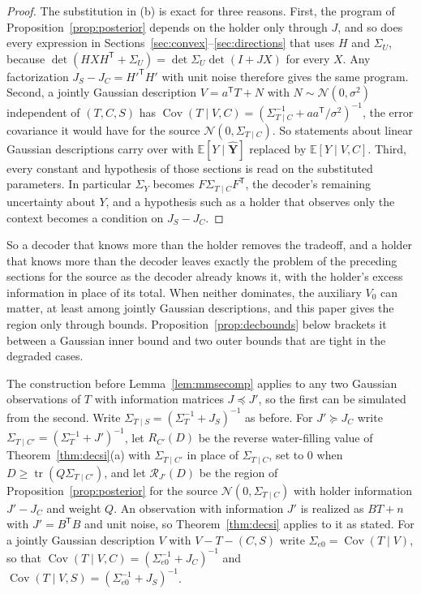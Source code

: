 \documentclass[11pt,onecolumn]{IEEEtran}
\newcommand{\E}{\mathbb{E}}
\newcommand{\tr}{\operatorname{tr}}
\newcommand{\Cov}{\operatorname{Cov}}
\newcommand{\hY}{\hat{\mathbf Y}}
\newcommand{\RW}{\mathcal{R}}
\newcommand{\Sez}{\Sigma_{e0}}
\begin{document}
\begin{proof}
The substitution in (b) is exact for three reasons. First, the program
of Proposition~\ref{prop:posterior} depends on the holder only through
$J$, and so does every expression in
Sections~\ref{sec:convex}--\ref{sec:directions} that uses $H$ and
$\Sigma_U$, because
$\det(HXH^{\mathsf T}+\Sigma_U)=\det\Sigma_U\det(I+JX)$ for every $X$.
Any factorization $J_S-J_C=H'^{\mathsf T}H'$ with unit noise therefore
gives the same program. Second, a jointly Gaussian description
$V=a^{\mathsf T}T+N$ with $N\sim\mathcal N(0,\sigma^2)$ independent of
$(T,C,S)$ has $\Cov(T\mid V,C)=(\Sigma_{T\mid C}^{-1}+aa^{\mathsf T}/\sigma^2)^{-1}$,
the error covariance it would have for the source
$\mathcal N(0,\Sigma_{T\mid C})$. So statements about linear Gaussian
descriptions carry over with $\E[Y\mid\hY]$ replaced by $\E[Y\mid V,C]$.
Third, every constant and hypothesis of those sections is read on the
substituted parameters. In particular $\Sigma_Y$ becomes
$F\Sigma_{T\mid C}F^{\mathsf T}$, the decoder's remaining uncertainty about
$Y$, and a hypothesis such as a holder that observes only the context
becomes a condition on $J_S-J_C$.
\end{proof}

So a decoder that knows more than the holder removes the tradeoff, and
a holder that knows more than the decoder leaves exactly the problem of
the preceding sections for the source as the decoder already knows it,
with the holder's excess information in place of its total. When
neither dominates, the auxiliary $V_0$ can matter, at least among
jointly Gaussian descriptions, and this paper gives
the region only through bounds. Proposition~\ref{prop:decbounds} below
brackets it between a Gaussian inner bound and two outer bounds that are
tight in the degraded cases.

The construction before Lemma~\ref{lem:mmsecomp} applies to any two
Gaussian observations of $T$ with information matrices $J\preceq J'$, so
the first can be simulated from the second. Write
$\Sigma_{T\mid S}=(\Sigma_T^{-1}+J_S)^{-1}$ as before. For $J'\succeq J_C$
write $\Sigma_{T\mid C'}=(\Sigma_T^{-1}+J')^{-1}$, let $R_{C'}(D)$ be the
reverse water-filling value of Theorem~\ref{thm:decsi}(a) with
$\Sigma_{T\mid C'}$ in place of $\Sigma_{T\mid C}$, set to $0$ when
$D\ge\tr(Q\Sigma_{T\mid C'})$, and let $\RW_{J'}(D)$ be the region of
Proposition~\ref{prop:posterior} for the source
$\mathcal N(0,\Sigma_{T\mid C})$ with holder information $J'-J_C$ and
weight $Q$. An observation with information $J'$ is realized as $BT+n$
with $J'=B^{\mathsf T}B$ and unit noise, so Theorem~\ref{thm:decsi}
applies to it as stated. For a jointly Gaussian description $V$ with
$V-T-(C,S)$ write $\Sez=\Cov(T\mid V)$, so that
$\Cov(T\mid V,C)=(\Sez^{-1}+J_C)^{-1}$ and
$\Cov(T\mid V,S)=(\Sez^{-1}+J_S)^{-1}$.
\end{document}
